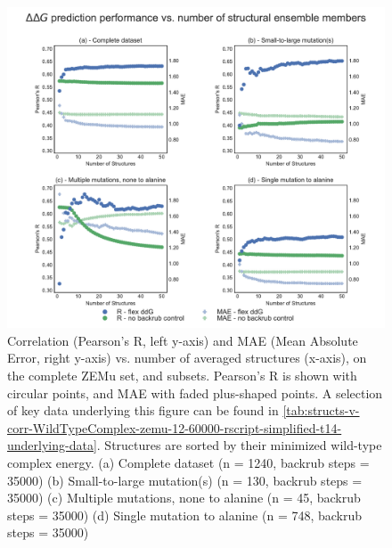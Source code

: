 \begin{figure}
  \includegraphics[width=\textwidth,keepaspectratio]{structs-v-corr-WildTypeComplex-zemu-12-60000-rscript-simplified-t14.pdf}
  \caption[]{ %
    Correlation (Pearson's R, left y-axis) and MAE (Mean Absolute Error, right y-axis) vs. number of averaged structures (x-axis), on the complete ZEMu set, and subsets.
    Pearson's R is shown with circular points, and MAE with faded plus-shaped points.
    A selection of key data underlying this figure can be found in \cref{tab:structs-v-corr-WildTypeComplex-zemu-12-60000-rscript-simplified-t14-underlying-data}.
    Structures are sorted by their minimized wild-type complex energy. 
    (a) Complete dataset (n = 1240, backrub steps = 35000)
    (b) Small-to-large mutation(s) (n = 130, backrub steps = 35000)
    (c) Multiple mutations, none to alanine (n = 45, backrub steps = 35000)
    (d) Single mutation to alanine (n = 748, backrub steps = 35000)
  } \label{fig:structs-v-corr-WildTypeComplex-zemu-12-60000-rscript-simplified-t14}
\end{figure}
